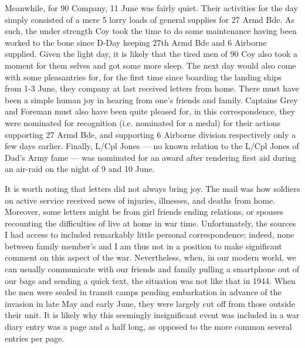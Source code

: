 \documentclass[noraggedright]{turabian-researchpaper}
\begin{document}
Meanwhile, for 90 Company, 11 June was fairly quiet.  Their activities for the
day simply consisted of a mere 5 lorry loads of general supplies for 27 Armd
Bde.  As such, the under strength Coy took the time to do some maintenance 
having been worked to the bone since D-Day keeping 27th Armd Bde and 6 Airborne
supplied.\autocite[11 June 1944]{90wd}  Given the light day, it is likely that
the tired men of 90 Coy also took a moment for them selves and got some more 
sleep.  The next day would also come with some pleasantries for, for the first
time since boarding the landing ships from 1-3 June, they company at last 
received letters from home.  %
There must have been a simple human joy in hearing from one's friends and 
family.  Captains Grey and Foreman must also have been quite pleased for, 
in this correspondence, they were nominated for recognition (i.e. nominated
for a medal) for their actions supporting 27 Armd Bde, and supporting 6 
Airborne division respectively only a few days earlier.  Finally, L/Cpl Jones
--- no known relation to the L/Cpl Jones of Dad's Army fame --- was nominated
for an award after rendering first aid during an air-raid on the night of 9 
and 10 June.\autocite[12 June 1944]{90wd}

It is worth noting that letters did not always bring joy.  The mail was how 
soldiers on active service received news of injuries, illnesses, and deaths 
from home.  Moreover, some letters might be from girl friends ending relations, 
or spouses recounting the difficulties of live at home in war time. 
Unfortunately, the sources I had access to included remarkably little 
personal correspondence; indeed, none between family member's and I am thus 
not in a position to make significant comment on this aspect of the war.
Nevertheless, when, in our modern world, we can usually communicate with our
friends and family pulling a smartphone out of our bags and sending a quick
text, the situation was not like that in 1944.  When the men were sealed
in transit camps pending embarkation in advance of the invasion in late May
and early June, they were largely cut off from those outside their unit.  
It is likely why this seemingly insignificant event was included in a war
diary entry was a page and a half long, as opposed to the more common several
entries per page.  
\end{document}
